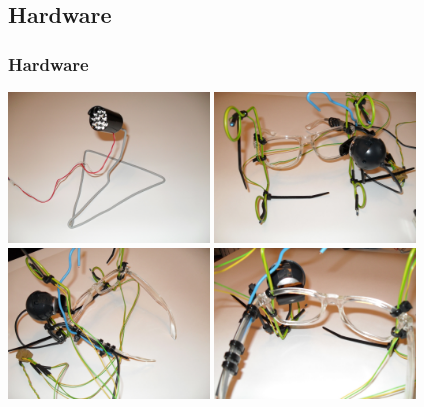 \documentclass[%
14pt
]{beamer}
\begin{document}
\subsection{Hardware}
\begin{frame}
	\frametitle{Hardware}
  \vspace*{-0.5cm}
  \begin{center}
    \includegraphics[width=0.4\textwidth]{SDC11117.JPG}
    \includegraphics[width=0.4\textwidth]{SDC11119.JPG}\\
    \includegraphics[width=0.4\textwidth]{SDC11121.JPG}
    \includegraphics[width=0.4\textwidth]{SDC11122.JPG}
  \end{center}

\end{frame}
\end{document}

